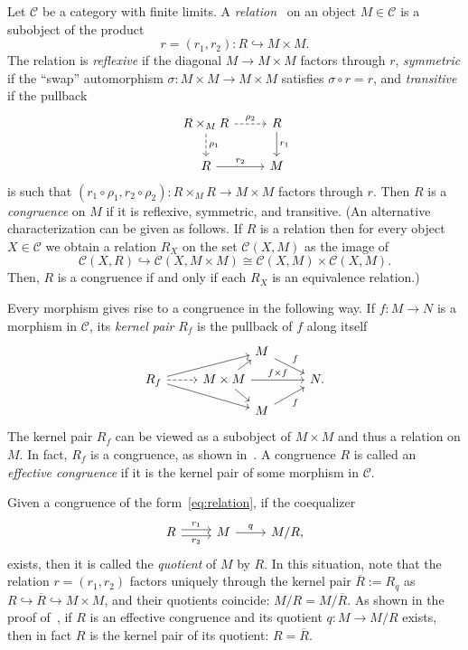 \documentclass[reqno]{amsart}
\newcommand{\C}{\mathcal{C}}
\numberwithin{equation}{section}
\theoremstyle{plain}
\theoremstyle{definition}
\begin{document}
Let $\C$ be a category with finite limits.
A \emph{relation}~\cite[Section~2.5]{Borceux:handbook2} on an object $M \in \C$ is a subobject of the product 
\begin{equation}\label{eq:relation}
r = (r_1, r_2) \colon R \hookrightarrow M \times M. 
\end{equation}
The relation is \emph{reflexive} if the diagonal $M \to M \times M$ factors through $r$, \emph{symmetric} if the ``swap'' automorphism $\sigma \colon M \times M \to M \times M$ satisfies $\sigma \circ r = r$, and \emph{transitive} if the pullback
\[
\begin{tikzcd}
R \times_M R \ar[r, dashrightarrow, "\rho_2"] \ar[d, dashrightarrow, "\rho_1"] & R \ar[d, "r_1"] \\
R \ar[r, "r_2"] & M
\end{tikzcd}
\]
is such that $(r_1 \circ \rho_1, r_2 \circ \rho_2) \colon R \times_M R \to M \times M$ factors through $r$.
Then $R$ is a \emph{congruence} 
on $M$ if it is reflexive, symmetric, and transitive. 
(An alternative characterization can be given as follows. If $R$ is a relation then for every object $X \in \C$ we obtain a relation $R_X$ on the set $\C(X,M)$ as the image of 
\[
\C(X,R) \hookrightarrow \C(X,M \times M) \cong \C(X,M) \times \C(X,M).
\]
Then, $R$ is a congruence if and only if each $R_X$ is an equivalence relation.)



Every morphism gives rise to a congruence in the following way.
If $f \colon M \to N$ is a morphism in $\C$, its \emph{kernel pair} $R_f$ is the pullback of $f$ along itself
\begin{equation}\label{eq:kernel pair}
\begin{tikzcd}
& &[-25pt] M \ar[dr, "f"] & \\[-1em]
R_f \ar[urr] \ar[drr] \ar[r, dashrightarrow] & M \times M \ar[ur] \ar[dr] \ar[rr, "f \times f"]  & & N. \\[-1em]
& & M \ar[ur, swap, "f"] & 
\end{tikzcd}
\end{equation}
The kernel pair $R_f$ can be viewed as a subobject of $M \times M$ and thus a relation on $M$. In fact, $R_f$ is a congruence, as shown in~\cite[Example~A.2.6]{BorceuxBorn}.
A congruence $R$ is called an \emph{effective congruence} if it is the kernel pair of some morphism in $\C$.

Given a congruence of the form~\eqref{eq:relation}, if the coequalizer %
\[
\begin{tikzcd}
R \ar[r, shift left, "r_1"] \ar[r, shift right, swap, "r_2"] & M \ar[r, "q"] & M/R,
\end{tikzcd}
\]
exists, then it is called the \emph{quotient} of $M$ by $R$.
In this situation, note that the relation $r = (r_1,r_2)$ factors uniquely through the kernel pair $\overline{R} := R_q$ as $R \hookrightarrow \overline{R} \hookrightarrow M \times M$, and their quotients coincide: $M/R = M/\overline{R}$.
As shown in the proof of~\cite[Proposition~A.5.12]{BorceuxBorn},
if $R$ is an effective congruence and its quotient $q \colon M \to M/R$ exists, then in fact $R$ is the kernel pair of its quotient: $R = \overline{R}$. 
\end{document}
